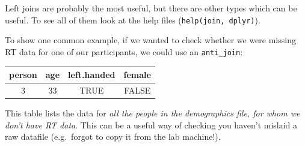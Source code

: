 \documentclass[]{article}
\newenvironment{Shaded}{\begin{snugshade}}{\end{snugshade}}
\newcommand{\KeywordTok}[1]{\textcolor[rgb]{0.13,0.29,0.53}{\textbf{#1}}}
\newcommand{\DataTypeTok}[1]{\textcolor[rgb]{0.13,0.29,0.53}{#1}}
\newcommand{\StringTok}[1]{\textcolor[rgb]{0.31,0.60,0.02}{#1}}
\newcommand{\OperatorTok}[1]{\textcolor[rgb]{0.81,0.36,0.00}{\textbf{#1}}}
\newcommand{\NormalTok}[1]{#1}
\theoremstyle{definition}
\theoremstyle{definition}
\theoremstyle{definition}
\theoremstyle{remark}
\begin{document}
Left joins are probably the most useful, but there are other types which
can be useful. To see all of them look at the help files
(\texttt{help(\textquotesingle{}join\textquotesingle{},\ \textquotesingle{}dplyr\textquotesingle{})}).

To show one common example, if we wanted to check whether we were
missing RT data for one of our participants, we could use an
\texttt{anti\_join}:

\begin{Shaded}
\end{Shaded}

\begin{longtable}[]{@{}cccc@{}}
\toprule
\begin{minipage}[b]{0.11\columnwidth}\centering\strut
person\strut
\end{minipage} & \begin{minipage}[b]{0.07\columnwidth}\centering\strut
age\strut
\end{minipage} & \begin{minipage}[b]{0.17\columnwidth}\centering\strut
left.handed\strut
\end{minipage} & \begin{minipage}[b]{0.10\columnwidth}\centering\strut
female\strut
\end{minipage}\tabularnewline
\midrule
\endhead
\begin{minipage}[t]{0.11\columnwidth}\centering\strut
3\strut
\end{minipage} & \begin{minipage}[t]{0.07\columnwidth}\centering\strut
33\strut
\end{minipage} & \begin{minipage}[t]{0.17\columnwidth}\centering\strut
TRUE\strut
\end{minipage} & \begin{minipage}[t]{0.10\columnwidth}\centering\strut
FALSE\strut
\end{minipage}\tabularnewline
\bottomrule
\end{longtable}

This table lists the data for \emph{all the people in the demographics
file, for whom we don't have RT data}. This can be a useful way of
checking you haven't mislaid a raw datafile (e.g.~forgot to copy it from
the lab machine!).
\end{document}

